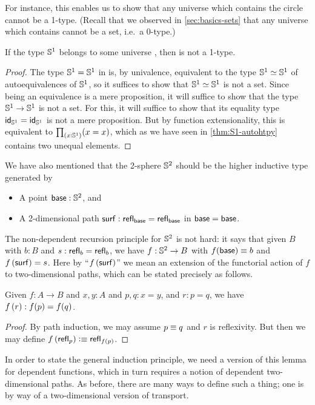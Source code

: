 For instance, this enables us to show that any universe which contains the circle cannot be a 1-type.
(Recall that we observed in \autoref{sec:basics-sets} that any universe which contains \bool cannot be a set, i.e.\ a 0-type.)

\begin{cor}
  If the type $\Sn^1$ belongs to some universe \type, then \type is not a 1-type.
\end{cor}
\begin{proof}
  The type $\Sn^1=\Sn^1$ in \type is, by univalence, equivalent to the type $\eqv{\Sn^1}{\Sn^1}$ of auto\-equivalences of $\Sn^1$, so it suffices to show that $\eqv{\Sn^1}{\Sn^1}$ is not a set.
  Since being an equivalence is a mere proposition, it will suffice to show that the type ${\Sn^1}\to{\Sn^1}$ is not a set.
  For this, it will suffice to show that its equality type $\idfunc[\Sn^1] = \idfunc[\Sn^1]$ is not a mere proposition.
  But by function extensionality, this is equivalent to $\prd{x:\Sn^1} (x=x)$, which as we have seen in \autoref{thm:S1-autohtpy} contains two unequal elements.
\end{proof}

We have also mentioned that the 2-sphere $\Sn^2$ should be the higher inductive type generated by
\begin{itemize}
\item A point $\base:\Sn^2$, and
\item A 2-dimensional path $\surf:\refl{\base} = \refl{\base}$ in ${\base=\base}$.
\end{itemize}
The non-dependent recursion principle for $\Sn^2$ is not hard: it says that given $B$ with $b:B$ and $s:\refl b = \refl b$, we have $f:\Sn^2\to B$ with $f(\base)\jdeq b$ and $\aptwo f \surf = s$.
Here by ``$\aptwo f \surf$'' we mean an extension of the functorial action of $f$ to two-dimensional paths, which can be stated precisely as follows.

\begin{lem}\label{thm:ap2}
  Given $f:A\to B$ and $x,y:A$ and $p,q:x=y$, and $r:p=q$, we have $\aptwo f r : \ap f p = \ap f q$.
\end{lem}
\begin{proof}
  By path induction, we may assume $p\jdeq q$ and $r$ is reflexivity.
  But then we may define $\aptwo f {\refl p} \defeq \refl{\ap f p}$.
\end{proof}

In order to state the general induction principle, we need a version of this lemma for dependent functions, which in turn requires a notion of dependent two-dimensional paths.
As before, there are many ways to define such a thing; one is by way of a two-dimensional version of transport.

